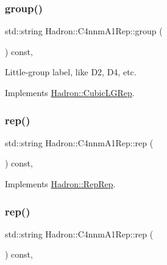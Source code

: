 \subsubsection{\texorpdfstring{group()}{group()}\hspace{0.1cm}{\footnotesize\ttfamily [5/5]}}
{\footnotesize\ttfamily std\+::string Hadron\+::\+C4nnm\+A1\+Rep\+::group (\begin{DoxyParamCaption}{ }\end{DoxyParamCaption}) const\hspace{0.3cm}{\ttfamily [inline]}, {\ttfamily [virtual]}}

Little-\/group label, like D2, D4, etc. 

Implements \mbox{\hyperlink{structHadron_1_1CubicLGRep_a9bdb14b519a611d21379ed96a3a9eb41}{Hadron\+::\+Cubic\+L\+G\+Rep}}.

\mbox{\label{structHadron_1_1C4nnmA1Rep_a9d7705f3d1e605e81c8c5a603bffb361}} 
\subsubsection{\texorpdfstring{rep()}{rep()}\hspace{0.1cm}{\footnotesize\ttfamily [1/5]}}
{\footnotesize\ttfamily std\+::string Hadron\+::\+C4nnm\+A1\+Rep\+::rep (\begin{DoxyParamCaption}{ }\end{DoxyParamCaption}) const\hspace{0.3cm}{\ttfamily [inline]}, {\ttfamily [virtual]}}



Implements \mbox{\hyperlink{structHadron_1_1RepRep_ab3213025f6de249f7095892109575fde}{Hadron\+::\+Rep\+Rep}}.

\mbox{\label{structHadron_1_1C4nnmA1Rep_a9d7705f3d1e605e81c8c5a603bffb361}} 
\subsubsection{\texorpdfstring{rep()}{rep()}\hspace{0.1cm}{\footnotesize\ttfamily [2/5]}}
{\footnotesize\ttfamily std\+::string Hadron\+::\+C4nnm\+A1\+Rep\+::rep (\begin{DoxyParamCaption}{ }\end{DoxyParamCaption}) const\hspace{0.3cm}{\ttfamily [inline]}, {\ttfamily [virtual]}}



